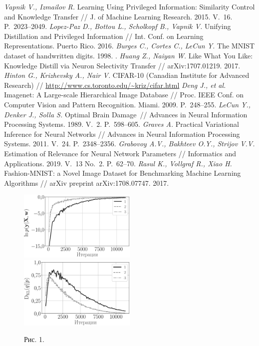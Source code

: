 \documentclass[12pt]{a&t}
\begin{document}
\begin{thebibliography}{10}
	\textit{Vapnik V., Izmailov R.} Learning Using Privileged Information: Similarity Control and Knowledge Transfer // J. of Machine Learning Research. 2015. V.~16. P.~2023--2049.
	\textit{Lopez-Paz D., Bottou L., Scholkopf B., Vapnik V.} Unifying Distillation and Privileged Information // Int. Conf. on Learning Representations. Puerto Rico. 2016.
	\textit{Burges C., Cortes C., LeCun Y.} The MNIST dataset of handwritten digits. 1998. .
	\textit{Huang Z., Naiyan W.} Like What You Like: Knowledge Distill via Neuron Selectivity Transfer // arXiv:1707.01219. 2017.
	\textit{Hinton G., Krizhevsky A., Nair V.} CIFAR-10 (Canadian Institute for Advanced Research) // \url{http://www.cs.toronto.edu/~kriz/cifar.html}
	\textit{Deng J., et al.} Imagenet: A Large-scale Hierarchical Image Database // Proc. IEEE Conf. on Computer Vision and Pattern Recognition. Miami. 2009. P.~248--255.
	\textit{LeCun Y., Denker J., Solla S.} Optimal Brain Damage~// Advances in Neural Information Processing Systems. 1989. V.~2. P.~598--605.
	\textit{Graves A.} Practical Variational Inference for Neural Networks // Advances in Neural Information Processing Systems. 2011. V.~24. P.~2348--2356.
	\textit{Grabovoy A.V., Bakhteev O.Y.,  Strijov V.V.} Estimation of Relevance for Neural Network Parameters // Informatics and Applications. 2019. V.~13 No.~2. P.~62--70.
	\textit{Rasul K., Vollgraf R., Xiao H.} Fashion-MNIST: a Novel Image Dataset for Benchmarking Machine Learning Algorithms // arXiv preprint arXiv:1708.07747. 2017.
\end{thebibliography}

\newpage
\begin{figure}[h!]
\includegraphics[width=0.5\textwidth]{synthetic_likelihood_3_layers.eps}
\includegraphics[width=0.5\textwidth]{synthetic_D_KL_3_layers.eps}
\caption{Рис. 1.}
\label{exp:fig1}
\end{figure}
\end{document}
